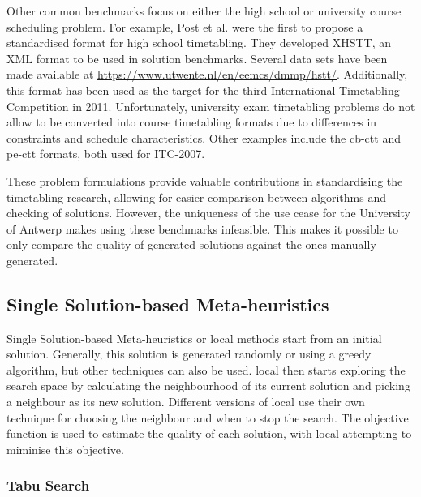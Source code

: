 Other common benchmarks focus on either the high school or university course scheduling problem. For example, Post et al. \cite{post2012} were the first to propose a standardised format for  high school timetabling. They developed XHSTT, an XML format to be used in solution benchmarks. Several data sets have been made available at \url{https://www.utwente.nl/en/eemcs/dmmp/hstt/}.
Additionally, this format has been used as the target for the third International Timetabling Competition in 2011. Unfortunately, university exam timetabling problems do not allow to be converted into course timetabling formats due to differences in constraints and schedule characteristics. Other examples include the \acrfull{cb-ctt} \cite{gaspero2007} and \acrfull{pe-ctt} \cite{lewis2007} formats, both used for ITC-2007.

These problem formulations provide valuable contributions in standardising the timetabling research, allowing for easier comparison between algorithms and checking of solutions. However, the uniqueness of the use cease for the University of Antwerp makes using these benchmarks infeasible. This makes it possible to only compare the quality of generated solutions against the ones manually generated.

\subsection{Single Solution-based Meta-heuristics}

Single Solution-based Meta-heuristics or \acrlong{local} methods start from an initial solution. Generally, this solution is generated randomly or using a greedy algorithm, but other techniques can also be used. \acrshort{local} then starts exploring the search space by calculating the neighbourhood of its current solution and picking a neighbour as its new solution. Different versions of \acrlong{local} use their own technique for choosing the neighbour and when to stop the search. The objective function is used to estimate the quality of each solution, with \acrshort{local} attempting to miminise this objective.
\subsubsection{Tabu Search}


